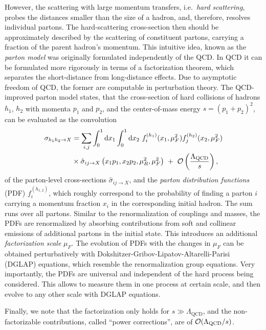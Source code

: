 However, the scattering with large momentum transfers, i.e.\ \emph{hard scattering}, 
probes the distances smaller than the size of a hadron, and, therefore, resolves individual partons.
The hard-scattering cross-section then should be approximately described by the scattering of constituent partons, carrying a fraction of
the parent hadron's momentum.
This intuitive idea, known as the \emph{parton model} \cite{Feynman1969} was originally formulated independently of the QCD.
In QCD it can be formulated more rigorously in terms of a factorization theorem,
which separates the short-distance from long-distance effects.
Due to asymptotic freedom of QCD, the former are computable in perturbation theory.
The QCD-improved parton model states, that the cross-section of hard collisions of hadrons $h_1$, $h_2$ with momenta $p_1$ and $p_2$,
and the center-of-mass energy $s=(p_1+p_2)^2$,
can be evaluated as the convolution
\begin{align}
\label{eq:factorization}\notag
  \sigma_{h_1 h_2 \to  X} &= \sum_{i,j}\int_0^1\dd x_1 \int_0^1 \dd x_2 ~ f_{i}^{(h_1)}(x_1,\mu_F^2)f_{j}^{(h_2)}(x_2,\mu_F^2) \\ 
 & \times
  \hat \sigma_{ij\rightarrow X}\left(x_1 p_1,x_2 p_2,\mu_R^2,{\mu_F^2}\right) 
  ~+~\mathcal{O}\left(\frac{\Lambda_\text{QCD} }{s}\right),
\end{align}
of the parton-level cross-sections $\hat \sigma_{ij\rightarrow X}$, and the \emph{parton distribution functions} (PDF) $f_i^{(h_{1,2})}$,
which roughly correspond to the probability of finding a parton $i$ carrying a momentum fraction $x_i$ in the corresponding initial hadron.
The sum runs over all partons.
Similar to the renormalization of couplings and masses, the PDFs are renormalized by
absorbing contributions from soft and collinear emissions of additional partons in the initial state.
This introduces an additional \emph{factorization scale}  $\mu_F$.
The evolution of PDFs with the changes in $\mu_F$ can be obtained perturbatively 
with Dokshitzer-Gribov-Lipatov-Altarelli-Parisi
\cite{Dokshitzer:1977sg,Gribov:1972ri,Altarelli:1977zs} (DGLAP)
equations, which resemble the renormalization group equations.
Very importantly, the PDFs are universal and independent of the hard process being considered.
This allows to measure them in one process at certain scale, and then evolve to any other scale with DGLAP equations.

Finally, we note that the factorization only holds for $s \gg \Lambda_\text{QCD} $, and
the non-factorizable contributions, called ``power corrections'', are of $\order{\Lambda_\text{QCD}/s}$.

